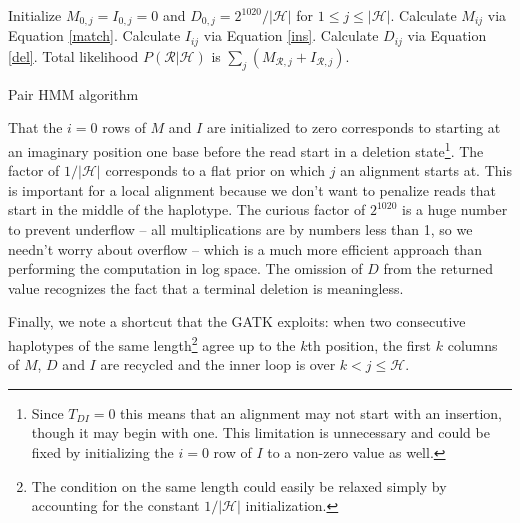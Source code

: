 \documentclass[nofootinbib,amssymb,amsmath]{revtex4}
\newcommand{\mc}[1]{\mathcal{#1}}
\begin{document}
\begin{algorithm}
\begin{algorithmic}[1]
\State Initialize $M_{0,j} = I_{0,j} = 0$ and $D_{0,j} = 2^{1020}/|\mc{H}|$ for $1 \le j \le |\mc{H}|$.
\For{$1 \le i \le | \mc{R} |$}
	\For{$1 \le j \le | \mc{H} |$}
		\State Calculate $M_{ij}$ via Equation \ref{match}.
		\State Calculate $I_{ij}$ via Equation \ref{ins}.
		\State Calculate $D_{ij}$ via Equation \ref{del}.
	\EndFor
\EndFor
\State Total likelihood $P(\mc{R} | \mc{H})$ is $\sum_j \left(M_{\mc{R},j} + I_{\mc{R},j} \right)$.
\end{algorithmic}
\caption{Pair HMM algorithm}
\label{pairHMM}
\end{algorithm}

That the $i = 0$ rows of $M$ and $I$ are initialized to zero corresponds to starting at an imaginary position one base before the read start in a deletion state\footnote{Since $T_{DI} = 0$ this means that an alignment may not start with an insertion, though it may begin with one.  This limitation is unnecessary and could be fixed by initializing the $i = 0$ row of $I$ to a non-zero value as well.}.  The factor of $1/|\mc{H}|$ corresponds to a flat prior on which $j$ an alignment starts at.  This is important for a local alignment because we don't want to penalize reads that start in the middle of the haplotype.  The curious factor of $2^{1020}$ is a huge number to prevent underflow -- all multiplications are by numbers less than 1, so we needn't worry about overflow -- which is a much more efficient approach than performing the computation in log space.  The omission of $D$ from the returned value recognizes the fact that a terminal deletion is meaningless.

Finally, we note a shortcut that the GATK exploits: when two consecutive haplotypes of the same length\footnote{The condition on the same length could easily be relaxed simply by accounting for the constant $1/|\mc{H}|$ initialization.}  agree up to the $k$th position, the first $k$ columns of $M$, $D$ and $I$ are recycled and the inner loop is over $k < j \le \mc{H}$.
\end{document}
